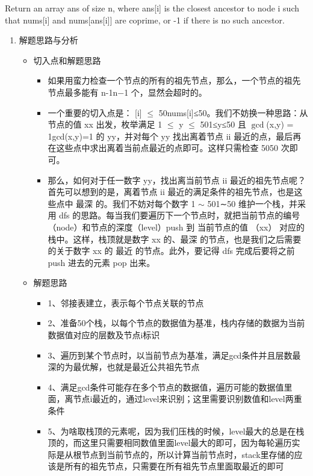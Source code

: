 \documentclass[9pt, b5paaper]{book}
\begin{document}
Return an array ans of size n, where ans[i] is the closest ancestor to node i such that nums[i] and nums[ans[i]] are coprime, or -1 if there is no such ancestor.
\begin{enumerate}
\item 解题思路与分析
\label{sec-3-0-3-1}

\begin{itemize}
\item 切入点和解题思路
\begin{itemize}
\item 如果用蛮力检查一个节点的所有的祖先节点，那么，一个节点的祖先节点最多能有 n-1n−1 个，显然会超时的。
\item 一个重要的切入点是： [i] $\le$ 50nums[i]≤50。我们不妨换一种思路：从节点的值 xx 出发，枚举满足 1 $\le$ y $\le$ 501≤y≤50 且 $\gcd$(x,y) = 1gcd(x,y)=1 的 yy，并对每个 yy 找出离着节点 ii 最近的点，最后再在这些点中求出离着当前点最近的点即可。这样只需检查 5050 次即可。
\item 那么，如何对于任一数字 yy，找出离当前节点 ii 最近的祖先节点呢？首先可以想到的是，离着节点 ii 最近的满足条件的祖先节点，也是这些点中 最深 的。我们不妨对每个数字 1 $\sim$ 501∼50 维护一个栈，并采用 dfs 的思路。每当我们要遍历下一个节点时，就把当前节点的编号 （node）和节点的深度（level）push 到 当前节点的值 （xx） 对应的栈中。这样，栈顶就是数字 xx 的、最深 的节点，也是我们之后需要的关于数字 xx 的 最近 的节点。此外，要记得 dfs 完成后要将之前 push 进去的元素 pop 出来。
\end{itemize}
\item 解题思路
\begin{itemize}
\item 1、邻接表建立，表示每个节点关联的节点
\item 2、准备50个栈，以每个节点的数据值为基准，栈内存储的数据为当前数据值对应的层数及节点i标识
\item 3、遍历到某个节点时，以当前节点为基准，满足gcd条件并且层数最深的为最优解，也就是最近公共祖先节点
\item 4、满足gcd条件可能存在多个节点的数据值，遍历可能的数据值里面，离节点i最近的，通过level来识别；这里需要识别数值和level两重条件
\item 5、为啥取栈顶的元素呢，因为我们压栈的时候，level最大的总是在栈顶的，而这里只需要相同数值里面level最大的即可，因为每轮遍历实际是从根节点到当前节点的，所以计算当前节点时，stack里存储的应该是所有的祖先节点，只需要在所有祖先节点里面取最近的即可


\end{itemize}
\end{itemize}
\end{enumerate}
\end{document}
